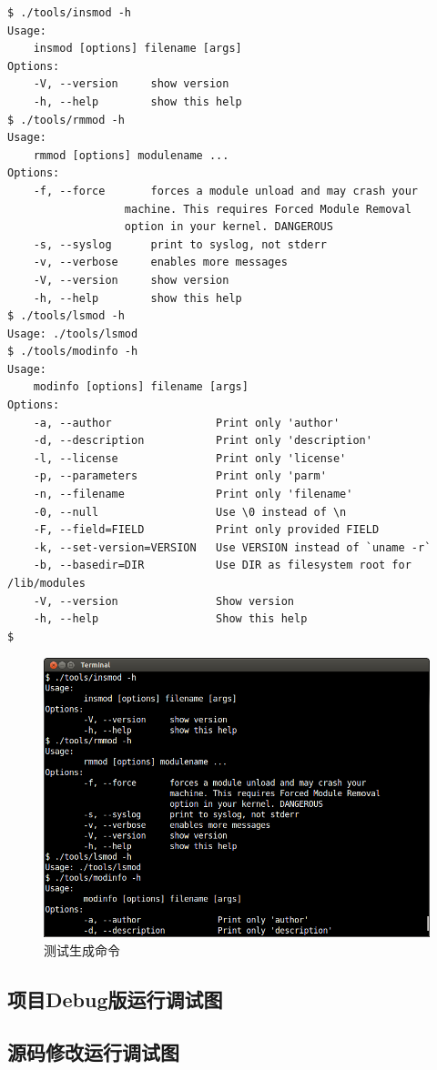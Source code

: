 \documentclass[11pt,a4paper]{article}
\makeatletter
\def\maxwidth{\ifdim\Gin@nat@width>\linewidth\linewidth
\else\Gin@nat@width\fi}
\let\Oldincludegraphics\includegraphics
\renewcommand{\includegraphics}[1]{\Oldincludegraphics[width=\maxwidth]{#1}}
\makeatother
\begin{document}
{\begin{shaded}\begin{verbatim}
$ ./tools/insmod -h
Usage:
    insmod [options] filename [args]
Options:
    -V, --version     show version
    -h, --help        show this help
$ ./tools/rmmod -h
Usage:
    rmmod [options] modulename ...
Options:
    -f, --force       forces a module unload and may crash your
                  machine. This requires Forced Module Removal
                  option in your kernel. DANGEROUS
    -s, --syslog      print to syslog, not stderr
    -v, --verbose     enables more messages
    -V, --version     show version
    -h, --help        show this help
$ ./tools/lsmod -h
Usage: ./tools/lsmod
$ ./tools/modinfo -h
Usage:
    modinfo [options] filename [args]
Options:
    -a, --author                Print only 'author'
    -d, --description           Print only 'description'
    -l, --license               Print only 'license'
    -p, --parameters            Print only 'parm'
    -n, --filename              Print only 'filename'
    -0, --null                  Use \0 instead of \n
    -F, --field=FIELD           Print only provided FIELD
    -k, --set-version=VERSION   Use VERSION instead of `uname -r`
    -b, --basedir=DIR           Use DIR as filesystem root for /lib/modules
    -V, --version               Show version
    -h, --help                  Show this help
$ 
\end{verbatim}\end{shaded}}
\begin{figure}[htbp]
\centering
\includegraphics{./pictures/1-5-test.png}
\caption{测试生成命令}
\end{figure}

\subsection{项目Debug版运行调试图}

\subsection{源码修改运行调试图}
\end{document}
